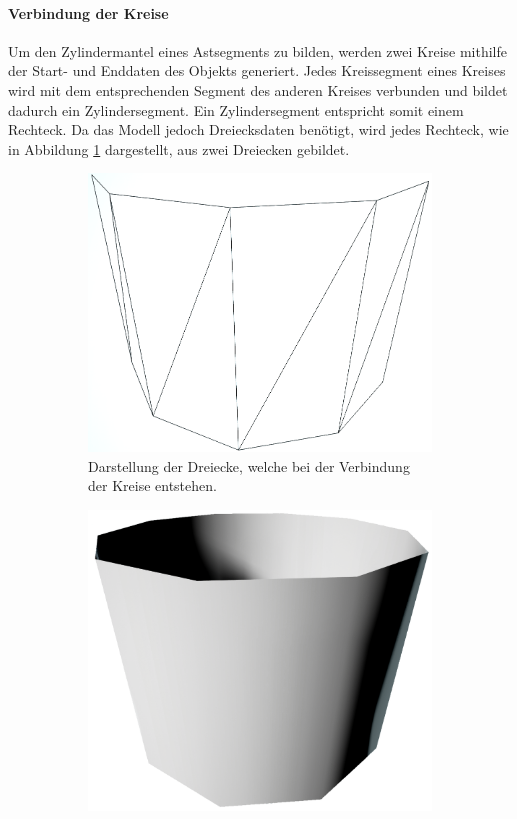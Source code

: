 \paragraph{Verbindung der Kreise}
Um den Zylindermantel eines Astsegments zu bilden, werden zwei Kreise mithilfe der Start- und Enddaten des Objekts generiert. Jedes Kreissegment eines Kreises wird mit dem entsprechenden Segment des anderen Kreises verbunden und bildet dadurch ein Zylindersegment. Ein Zylindersegment entspricht somit einem Rechteck. Da das Modell jedoch Dreiecksdaten benötigt, wird jedes Rechteck, wie in Abbildung \ref{subfig:Zylinder10SegmenteWireframe} dargestellt, aus zwei Dreiecken gebildet. \cite{ModelingByNumbersZylindersA:13}
\begin{figure} [hbtp]
\centering
\begin{subfigure}[t]{.4\textwidth}
	\centering
	\includegraphics[height=.75\linewidth]{images/Zylinder10SegmenteWireframe.png}
	\caption{Darstellung der Dreiecke, welche bei der Verbindung der Kreise entstehen.}
	\label{subfig:Zylinder10SegmenteWireframe}
\end{subfigure}
\hspace{.1\textwidth}
\begin{subfigure}[t]{.4\textwidth}
	\centering
	\includegraphics[height=.75\linewidth]{images/Zylinder10SegmenteOpaque.png}

\end{subfigure}
\end{figure}
